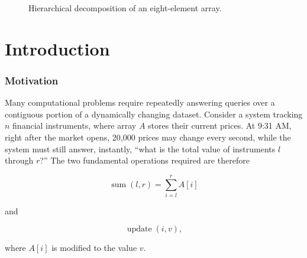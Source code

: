 \documentclass[11pt,open=any,headings=option]{scrreprt}
\begin{document}
\begin{figure}[H]
\centering
{}
\caption{Hierarchical decomposition of an eight-element array.}
\label{fig:hierarchy}
\end{figure}

\chapter{Introduction}

\subsection{Motivation}
Many computational problems require repeatedly answering queries over a contiguous portion of a dynamically changing dataset. Consider a system tracking $n$ financial instruments, where array $A$ stores their current prices. At 9:31 AM, right after the market opens, 20{,}000 prices may change every second, while the system must still answer, instantly, ``what is the total value of instruments $l$ through $r$?'' The two fundamental operations required are therefore

\begin{equation}
\operatorname{sum}(l,r) = \sum_{i=l}^{r} A[i]
\label{eq:sum}
\end{equation}

and

\begin{equation}
\operatorname{update}(i,v),
\label{eq:update}
\end{equation}

where $A[i]$ is modified to the value $v$.
\end{document}
